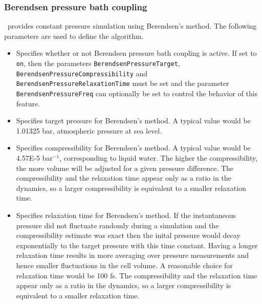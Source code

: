 \subsubsection{Berendsen pressure bath coupling}

\PDAC\ provides constant pressure simulation using Berendsen's method.  
The following parameters are used to define the algorithm.  

\begin{itemize}

\item
{}
{Specifies whether or not Berendsen pressure bath coupling is active.  
If set to {\tt on}, then the parameters {\tt BerendsenPressureTarget}, {\tt BerendsenPressureCompressibility} and {\tt BerendsenPressureRelaxationTime} must be set 
and the parameter {\tt BerendsenPressureFreq} can
optionally be set to control the behavior of this feature.} 

\item
{}
{Specifies target pressure for Berendsen's method.
A typical value would be 1.01325 bar, atmospheric pressure at sea level.}

\item
{}
{Specifies compressibility for Berendsen's method.
A typical value would be 4.57E-5 bar$^{-1}$, corresponding to liquid water.
The higher the compressibility, the more volume will be adjusted for a
given pressure difference.
The compressibility and the relaxation time appear only as a ratio in the
dynamics, so a larger compressibility is equivalent to a smaller relaxation
time.}

\item
{}
{Specifies relaxation time for Berendsen's method.
If the instantaneous pressure did not fluctuate randomly during a simulation
and the compressibility estimate was exact then
the inital pressure would decay exponentially to the target pressure with
this time constant.
Having a longer relaxation time results in more averaging over pressure
measurements and hence smaller fluctuations in the cell volume.
A reasonable choice for relaxation time would be 100 fs.
The compressibility and the relaxation time appear only as a ratio in the
dynamics, so a larger compressibility is equivalent to a smaller relaxation
time.}


\end{itemize}
